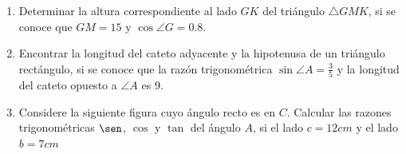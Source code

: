\documentclass[12pt]{article}
\begin{document}
\begin{enumerate}[leftmargin=*]
\begin{center}
\end{center}
\item Determinar la altura correspondiente al lado $GK$ del triángulo $\triangle GMK$, si se conoce que  $GM = 15$ y $\cos \angle G = 0.8$.
\begin{center}
\end{center}
\item Encontrar la longitud del cateto adyacente y la hipotenusa de un triángulo rectángulo, si se conoce que la razón trigonométrica $\sin \angle A = \frac{3}{5}$ y la longitud del cateto opuesto a $\angle A$ es $9$.

\item Considere la siguiente figura cuyo \'angulo recto es en $C$. Calcular las razones trigonom\'etricas $\sen$, $\cos$ y $\tan$ del \'angulo $A$, si el lado $c=12cm$ y el lado $b=7cm$
\begin{center}
    \begin{tikzpicture}
    

\end{tikzpicture}
\end{center}
\end{enumerate}
\end{document}
